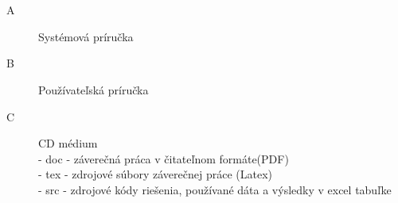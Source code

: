 
\chapter*{\appendixlistname}

\begin{description}
	\item[\appendixname{} A] Systémová príručka
	\item[\appendixname{} B] Používateľská príručka
	\item[\appendixname{} C] CD médium 
	\\- doc - záverečná práca v čitateľnom formáte(PDF)
	\\- tex - zdrojové súbory záverečnej práce (Latex)
	\\- src - zdrojové kódy riešenia, používané dáta a výsledky v excel tabuľke
\end{description}
